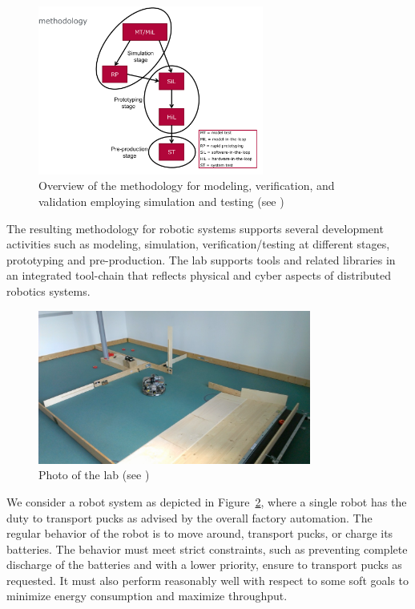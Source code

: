 \begin{figure}[!htb]
\centering
\includegraphics[width=0.66\textwidth]{figures/methodology.pdf}
\caption{Overview of the methodology for modeling, verification, and validation employing simulation and testing (see \cite{Broekman&Notenboom2003})}
\label{fig:methodology}
\end{figure}

The resulting methodology for robotic systems supports several development activities such as modeling, simulation, verification/testing at different stages, prototyping and pre-production. The lab supports tools and related libraries in an integrated tool-chain that reflects physical and cyber aspects of distributed robotics systems.

\begin{figure}[!htb]
\centering
\includegraphics[width=0.8\textwidth]{figures/evaluation_scenario_2.pdf}
\caption{Photo of the lab (see \cite{Waetzoldt:2012pa})}
\label{fig:evaluation_scenario_2}
\end{figure}


We consider a robot system as depicted in Figure~\ref{fig:evaluation_scenario_2}, where a single robot has the duty to transport pucks as advised by the overall factory automation. The regular behavior of the robot is to move around, transport pucks, or charge its batteries. The behavior must meet strict constraints, such as preventing complete discharge of the batteries and with a lower priority, ensure to transport pucks as requested. It must also perform reasonably well with respect to some soft goals to minimize energy consumption and maximize throughput.

